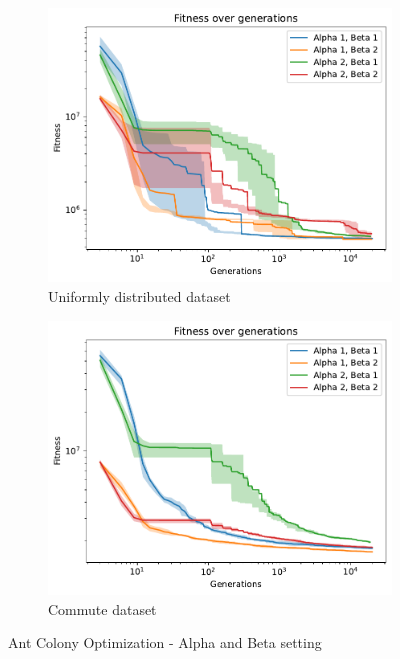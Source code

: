 \begin{figure}[ht]
    \centering
    \begin{subfigure}[b]{0.45\textwidth}
        \includegraphics[width=\textwidth]{img/aco_random_ab.pdf}
        \caption{Uniformly distributed dataset}
        \label{fig:aco_ab_random}
    \end{subfigure}
    \begin{subfigure}[b]{0.45\textwidth}
        \includegraphics[width=\textwidth]{img/aco_commute_ab.pdf}
        \caption{Commute dataset}
        \label{fig:aco_ab_commute}
    \end{subfigure}
    \caption{Ant Colony Optimization - Alpha and Beta setting}
    \label{fig:aco_alpha_beta}
\end{figure}

